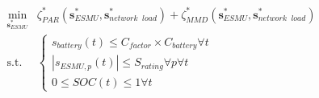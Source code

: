 \begin{equation}
\begin{split}
	\min_{\textbf{s}^*_{ESMU}} & \zeta^*_{PAR}(\textbf{s}^*_{ESMU}, \textbf{s}^*_{network\;\;load}) + \zeta^*_{MMD}(\textbf{s}^*_{ESMU}, \textbf{s}^*_{network\;\;load})\\
	\text{s.t. }& \begin{cases}
		s_{battery}(t) \leq C_{factor}\times C_{battery} \forall t\\
		\left|s_{ESMU,p}(t)\right| \leq S_{rating} \forall p \forall t\\
		0 \leq SOC(t) \leq 1 \forall t
	\end{cases}
\end{split}
\label{ch1:equ:scheduling-cost}
\end{equation}